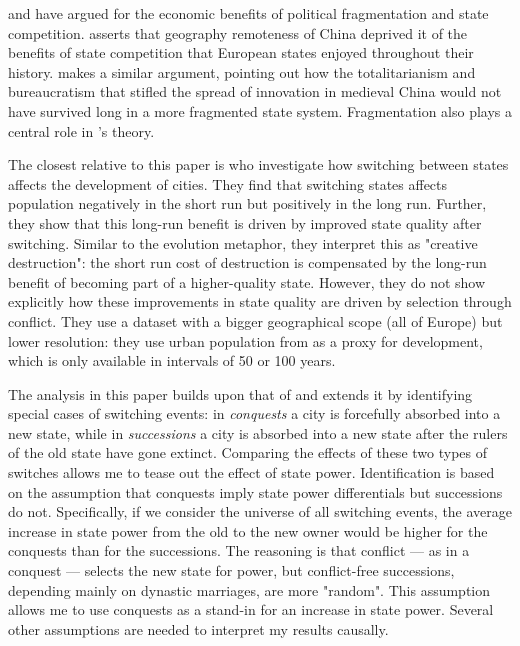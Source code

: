\documentclass[11pt, a4paper]{article}
\begin{document}
\cite{diamond1997} and \cite{landes1969, landes2006} have argued for the economic benefits of political fragmentation and state competition. \cite{diamond1997} asserts that geography 
remoteness of China deprived it of the benefits of state competition that European states enjoyed throughout their history. \cite{landes2006} makes a similar argument, pointing out how the totalitarianism and bureaucratism that stifled the spread of innovation in medieval China would not have survived long in a more fragmented state system. Fragmentation also plays a central role in \cite{cervellati2022}'s theory.

The closest relative to this paper is \cite{schoenholzer2022} who investigate how switching between states affects the development of cities. They find that switching states affects population negatively in the short run but positively in the long run. Further, they show that this long-run benefit is driven by improved state quality after switching. Similar to the evolution metaphor, they interpret this as "creative destruction": the short run cost of destruction is compensated by the long-run benefit of becoming part of a higher-quality state. However, they do not show explicitly how these improvements in state quality are driven by selection through conflict. They use a dataset with a bigger geographical scope (all of Europe) but lower resolution: they use urban population from \cite{bairoch1988} as a proxy for development, which is only available in intervals of 50 or 100 years. 

The analysis in this paper builds upon that of \cite{schoenholzer2022} and extends it by identifying special cases of switching events: in \textit{conquests} a city is forcefully absorbed into a new state, while in \textit{successions} a city is absorbed into a new state after the rulers of the old state have gone extinct. Comparing the effects of these two types of switches allows me to tease out the effect of state power. Identification is based on the assumption that conquests imply state power differentials but successions do not. Specifically, if we consider the universe of all switching events, the average increase in state power from the old to the new owner would be higher for the conquests than for the successions. The reasoning is that conflict --- as in a conquest --- selects the new state for power, but conflict-free successions, depending mainly on dynastic marriages, are more "random". This assumption allows me to use conquests as a stand-in for an increase in state power. Several other assumptions are needed to interpret my results causally.
\end{document}
